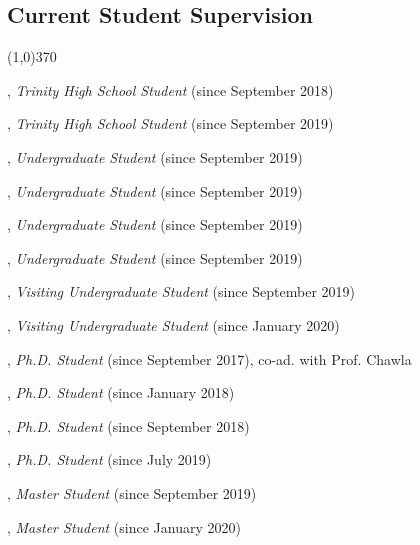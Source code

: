 \documentclass[10pt]{article}
\newenvironment{myindentpar}[1]%
{\begin{list}{}%
         {\setlength{\leftmargin}{#1}}%
         \item[]%
}
{\end{list}}
\newcounter{list}
\begin{document}
\subsection{\sc Current Student Supervision}
\vspace{-0.4cm} \line(1,0){370} \vspace{-0.1cm}

\begin{myindentpar}{0.75cm}

\hspace{-0.75cm}{\bf Eric Zhang}, \emph{Trinity High School Student} (since September 2018)

\hspace{-0.75cm}{\bf Michael Florin}, \emph{Trinity High School Student} (since September 2019)

\hspace{-0.75cm}{\bf Xiangyu Dong}, \emph{Undergraduate Student} (since September 2019)

\hspace{-0.75cm}{\bf Chan Hee Song}, \emph{Undergraduate Student} (since September 2019)

\hspace{-0.75cm}{\bf Tianze Zheng}, \emph{Undergraduate Student} (since September 2019)

\hspace{-0.75cm}{\bf Bo Ni}, \emph{Undergraduate Student} (since September 2019)

\hspace{-0.75cm}{\bf Zaitang Li}, \emph{Visiting Undergraduate Student} (since September 2019)

\hspace{-0.75cm}{\bf Jiajun Huang}, \emph{Visiting Undergraduate Student} (since January 2020)

\hspace{-0.75cm}{\bf Daheng Wang}, \emph{Ph.D. Student} (since September 2017), co-ad. with Prof. Chawla

\hspace{-0.75cm}{\bf Qingkai Zeng}, \emph{Ph.D. Student} (since January 2018)

\hspace{-0.75cm}{\bf Tong Zhao}, \emph{Ph.D. Student} (since September 2018)

\hspace{-0.75cm}{\bf Wenhao Yu}, \emph{Ph.D. Student} (since July 2019)


\hspace{-0.75cm}{\bf Jianing Li}, \emph{Master Student} (since September 2019)

\hspace{-0.75cm}{\bf Bhakti Sharma}, \emph{Master Student} (since January 2020)

\end{myindentpar}
\end{document}
